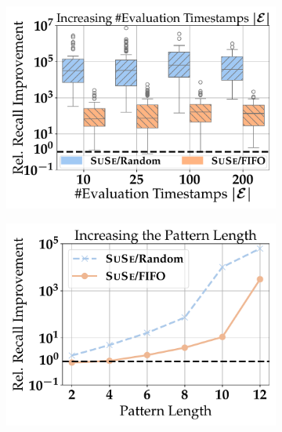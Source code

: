 \begin{figure}[t]
	\centering
	

	\begin{subfigure}{.38\linewidth}
		\centering
		\includegraphics[width=\linewidth]{revision_plots/number_of_evaluation_timestamps_plot.pdf}
		\vspace{-18pt}
		\caption{}
		\label{plot:evaluation_timestamps}
	\end{subfigure}
	\hfill
	\begin{subfigure}{.38\linewidth}
		\centering
		\includegraphics[width=\linewidth]{revision_plots/query_length_plot.pdf}
		\vspace{-18pt}
		\caption{}
		\label{plot:query_length}
	\end{subfigure}
    

\end{figure}
